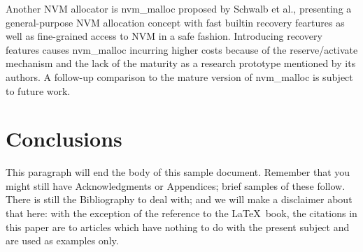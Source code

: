 \documentclass{vldb}
\begin{document}
Another NVM allocator is nvm\_malloc proposed by Schwalb et al.\cite{schwalbnvm},
presenting a general-purpose NVM allocation concept with fast builtin recovery feartures
as well as fine-grained access to NVM in a safe fashion.
Introducing recovery features causes nvm\_malloc incurring higher costs
because of the reserve/activate mechanism and the lack of the maturity as a research prototype mentioned by its authors.
A follow-up comparison to the mature version of nvm\_malloc is subject to future work.



\section{Conclusions}
This paragraph will end the body of this sample document.
Remember that you might still have Acknowledgments or
Appendices; brief samples of these
follow.  There is still the Bibliography to deal with; and
we will make a disclaimer about that here: with the exception
of the reference to the \LaTeX\ book, the citations in
this paper are to articles which have nothing to
do with the present subject and are used as
examples only.

\balance





\end{document}
